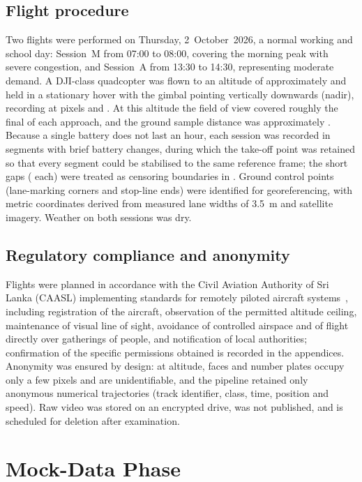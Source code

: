 \subsection{Flight procedure}
Two flights were performed on Thursday, 2~October~2026, a normal working and school day: Session~M from 07:00 to 08:00, covering the morning peak with severe congestion, and Session~A from 13:30 to 14:30, representing moderate demand. A DJI-class quadcopter was flown to an altitude of approximately  and held in a stationary hover with the gimbal pointing vertically downwards (nadir), recording at  pixels and . At this altitude the field of view covered roughly the final  of each approach, and the ground sample distance was approximately . Because a single battery does not last an hour, each session was recorded in  segments with brief battery changes, during which the take-off point was retained so that every segment could be stabilised to the same reference frame; the short gaps ( each) were treated as censoring boundaries in \dtx{}. Ground control points (lane-marking corners and stop-line ends) were identified for georeferencing, with metric coordinates derived from measured lane widths of 3.5~m and satellite imagery. Weather on both sessions was dry.

\subsection{Regulatory compliance and anonymity}
Flights were planned in accordance with the Civil Aviation Authority of Sri Lanka (CAASL) implementing standards for remotely piloted aircraft systems~\cite{caasl_drone}, including registration of the aircraft, observation of the permitted altitude ceiling, maintenance of visual line of sight, avoidance of controlled airspace and of flight directly over gatherings of people, and notification of local authorities; confirmation of the specific permissions obtained is recorded in the appendices. Anonymity was ensured by design: at  altitude, faces and number plates occupy only a few pixels and are unidentifiable, and the \dtx{} pipeline retained only anonymous numerical trajectories (track identifier, class, time, position and speed). Raw video was stored on an encrypted drive, was not published, and is scheduled for deletion after examination.

\section{Mock-Data Phase}\label{sec:method-mock}


